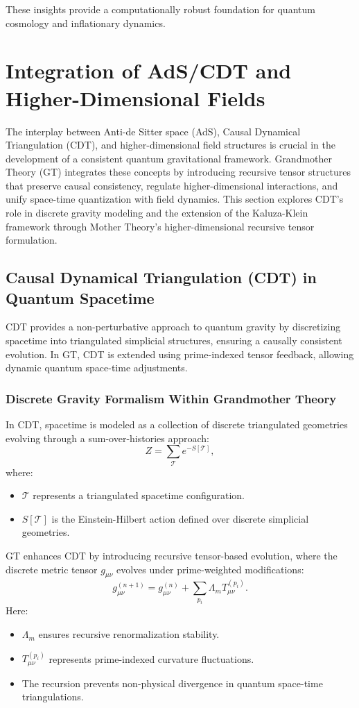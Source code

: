 \documentclass{article}
\theoremstyle{plain}
\begin{document}
These insights provide a computationally robust foundation for quantum cosmology and inflationary dynamics.

\section{Integration of AdS/CDT and Higher-Dimensional Fields}

The interplay between Anti-de Sitter space (AdS), Causal Dynamical Triangulation (CDT), and higher-dimensional field structures is crucial in the development of a consistent quantum gravitational framework. Grandmother Theory (GT) integrates these concepts by introducing recursive tensor structures that preserve causal consistency, regulate higher-dimensional interactions, and unify space-time quantization with field dynamics. This section explores CDT’s role in discrete gravity modeling and the extension of the Kaluza-Klein framework through Mother Theory’s higher-dimensional recursive tensor formulation.

\subsection{Causal Dynamical Triangulation (CDT) in Quantum Spacetime}
CDT provides a non-perturbative approach to quantum gravity by discretizing spacetime into triangulated simplicial structures, ensuring a causally consistent evolution. In GT, CDT is extended using prime-indexed tensor feedback, allowing dynamic quantum space-time adjustments.

\subsubsection{Discrete Gravity Formalism Within Grandmother Theory}
In CDT, spacetime is modeled as a collection of discrete triangulated geometries evolving through a sum-over-histories approach:
\begin{equation}
Z = \sum_{\mathcal{T}} e^{-S[\mathcal{T}]},
\end{equation}
where:
\begin{itemize}
\item $\mathcal{T}$ represents a triangulated spacetime configuration.
\item $S[\mathcal{T}]$ is the Einstein-Hilbert action defined over discrete simplicial geometries.
\end{itemize}

GT enhances CDT by introducing recursive tensor-based evolution, where the discrete metric tensor $g_{\mu\nu}$ evolves under prime-weighted modifications:
\begin{equation}
g_{\mu\nu}^{(n+1)} = g_{\mu\nu}^{(n)} + \sum_{p_i} \Lambda_m T_{\mu\nu}^{(p_i)}.
\end{equation}
Here:
\begin{itemize}
\item $\Lambda_m$ ensures recursive renormalization stability.
\item $T_{\mu\nu}^{(p_i)}$ represents prime-indexed curvature fluctuations.
\item The recursion prevents non-physical divergence in quantum space-time triangulations.
\end{itemize}
\end{document}
